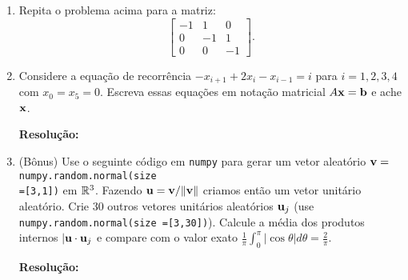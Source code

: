 \documentclass[leqno]{article}
\numberwithin{equation}{section}
\newenvironment{sol}
{
    \vspace{4mm}
    \noindent\textbf{Resolução:}
    \strut\newline
    \smallskip
    \hspace{-3.5mm}
}
{}
\begin{document}
\begin{enumerate}
\begin{sol} 
\end{sol} 

\item Repita o problema acima para a matriz:
$$\begin{bmatrix}
-1 & 1 & 0\\
0 & -1 & 1\\
0 & 0 & -1
\end{bmatrix}.$$

\item Considere a equação de recorrência $-x_{i+1} + 2x_i - x_{i-1} = i$ para $i=1,2,3,4$ com $x_0 = x_5 = 0$. Escreva essas equações em notação matricial $A\mathbf{x} = \mathbf{b}$ e ache $\mathbf{x}$.

\begin{sol} 
\end{sol} 

\item (Bônus) Use o seguinte código em \texttt{numpy} para gerar um vetor aleatório $\mathbf{v}=$\texttt{numpy.random.normal(size
\\=[3,1])} em $\mathbb{R}^3$. Fazendo $\mathbf{u} = \mathbf{v}/\|\mathbf{v}\|$ criamos então um vetor unitário aleatório. Crie 30 outros vetores unitários aleatórios $\mathbf{u}_j$ (use \texttt{numpy.random.normal(size
=[3,30])}). Calcule a média dos produtos internos $|\mathbf{u} \cdot \mathbf{u}_j$ e compare com o valor exato $\frac{1}{\pi}\int_0^\pi |\cos \theta| d\theta = \frac{2}{\pi}$.

\begin{sol} 
\end{sol} 
\end{enumerate}
\end{document}
